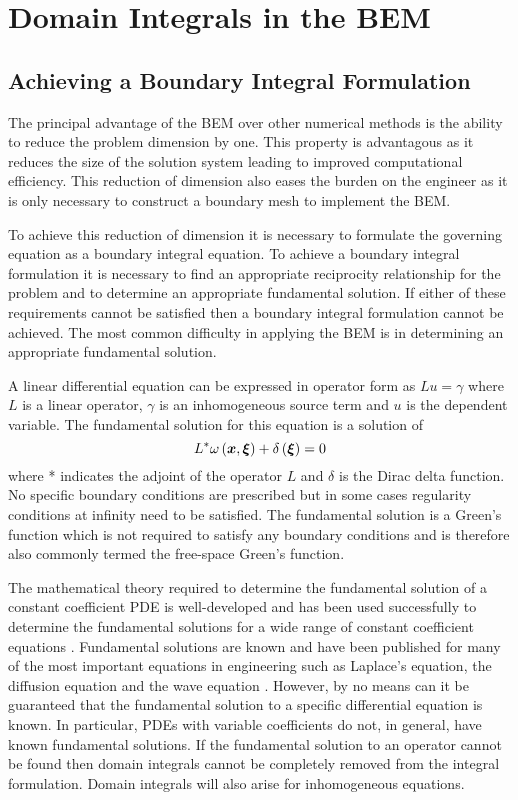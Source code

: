 \chapter{Domain Integrals in the BEM}

\section{Achieving a Boundary Integral Formulation}

The principal advantage of the BEM over other numerical methods is the
ability to reduce the problem dimension by one.  This property is
advantagous as it reduces the size of the solution system leading to
improved computational efficiency.  This reduction of dimension also eases
the burden on the engineer as it is only necessary to construct a boundary
mesh to implement the BEM.

To achieve this reduction of dimension it is necessary to formulate the
governing equation as a boundary integral equation.  To achieve a boundary
integral formulation it is necessary to find an appropriate reciprocity
relationship for the problem and to determine an appropriate fundamental
solution.  If either of these requirements cannot
be satisfied then a boundary integral formulation cannot be achieved.  The
most common difficulty in applying the BEM is in determining an appropriate
fundamental solution.

A linear differential equation can be expressed in operator form as $Lu =
\gamma$ where $L$ is a linear operator, $\gamma$ is an inhomogeneous source
term and $u$ is the dependent variable.  The fundamental solution for this
equation is a solution of
\begin{equation}
  L^{*} \fnof{\omega}{\vect{x},\vect{\xi}}  + \fnof{\delta}{\vect{\xi}} = 0
\end{equation}
where * indicates the adjoint of the operator $L$ and $\delta$ is the Dirac
delta function.  No specific boundary conditions are prescribed but in some
cases regularity conditions at infinity need to be satisfied. The
fundamental solution is a Green's function which is not required to satisfy
any boundary conditions and is therefore also commonly termed the
free-space Green's function.

The mathematical theory required to determine the fundamental solution of a
constant coefficient PDE is well-developed and has been used successfully
to determine the fundamental solutions for a wide range of constant
coefficient equations \citep{walker:1980} \citep{clements:1978}
\citep{ortner:1987}.  Fundamental solutions are known and have been
published for many of the most important equations in engineering such as
Laplace's equation, the diffusion equation and the wave equation
\citep{brebbia:1984b}.  However, by no means can it be guaranteed that the
fundamental solution to a specific differential equation is known.  In
particular, PDEs with variable coefficients do not, in general, have known
fundamental solutions.  If the fundamental solution to an operator cannot
be found then domain integrals cannot be completely removed from the
integral formulation.  Domain integrals will also arise for inhomogeneous
equations.

